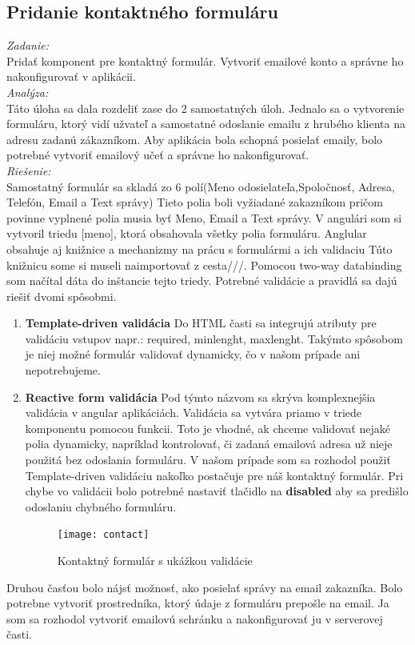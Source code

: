 \documentclass[11pt, oneside]{report}
\begin{document}
\subsection{Pridanie kontaktného formuláru }
\textit{Zadanie:}\\
Pridať komponent pre kontaktný formulár. Vytvoriť emailové konto a správne ho nakonfigurovať v aplikácii.
\\\textit{Analýza:}\\
Táto úloha sa dala rozdeliť zase do 2 samostatných úloh. Jednalo sa o vytvorenie formuláru, ktorý vidí užvateľ a  samostatné odoslanie emailu z hrubého klienta na adresu zadanú zákazníkom. Aby aplikácia bola schopná posielať emaily, bolo potrebné vytvoriť emailový učeť a správne ho nakonfigurovať.
\\\textit{Riešenie:}\\
Samostatný formulár sa skladá zo 6 polí(Meno odosielateľa,Spoločnosť, Adresa, Telefón, Email a Text správy) Tieto polia boli vyžiadané zakazníkom  pričom povinne vyplnené polia musia byť Meno, Email a Text správy. V angulári som si vytvoril triedu [meno], ktorá obsahovala všetky polia formuláru. Anglular obsahuje aj knižnice a mechanizmy na prácu s formulármi a ich validaciu Túto knižnicu some si museli naimportovať z  \textsf{cesta///}. Pomocou two-way databinding som načítal dáta  do inštancie tejto triedy. Potrebné validácie a pravidlá sa dajú riešiť dvomi spôsobmi. 
\begin{enumerate}
\item\textbf{Template-driven validácia} Do HTML časti  sa integrujú  atributy pre validáciu vstupov napr.: \textsf{required, minlenght, maxlenght}. Takýmto spôsobom  je niej možné formulár validovať dynamicky, čo v našom prípade ani nepotrebujeme.
\item\textbf{Reactive form validácia} Pod týmto názvom sa skrýva komplexnejšia  validácia v angular aplikáciách. Validácia sa vytvára priamo v triede komponentu pomocou funkcii.  Toto je vhodné, ak chceme validovať nejaké polia dynamicky, napríklad kontrolovať, či  zadaná emailová adresa  už nieje použitá bez odoslania formuláru.
 V našom  prípade som sa rozhodol použiť Template-driven validáciu nakoľko postačuje pre náš kontaktný formulár. Pri chybe vo validácii   bolo potrebné nastaviť tlačidlo na \textbf{disabled} aby sa predišlo odoslaniu chybného formuláru.
\begin{figure}[h]
    \centering
    \texttt{[image: contact]}
    \caption{Kontaktný formulár s ukážkou validácie }
    \label{fig:mesh1}
\end{figure}
\end{enumerate} 
 Druhou časťou bolo nájsť možnosť, ako posielať správy na email zakazníka. Bolo potrebne vytvoriť prostredníka, ktorý údaje z formuláru prepošle na email.  Ja som sa rozhodol vytvoriť emailovú schránku a nakonfigurovať ju v serverovej časti.
\end{document}
